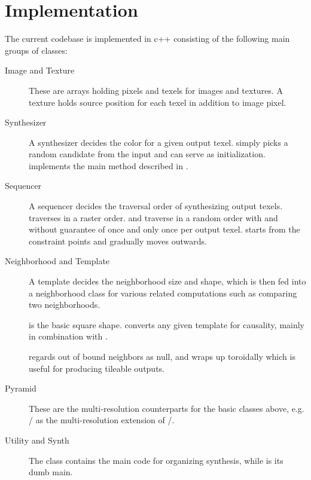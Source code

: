 \section{Implementation}
\label{sec:implementation}

The current codebase is implemented in c++ consisting of the following main groups of classes:

\begin{description}

\item[Image and Texture]

These are arrays holding pixels and texels for images and textures.
A texture holds source position for each texel in addition to image pixel.

\item[Synthesizer]

A synthesizer decides the color for a given output texel.
 simply picks a random candidate from the input and can serve as initialization.
 implements the main method described in .

\item[Sequencer]

A sequencer decides the traversal order of synthesizing output texels.
 traverses in a raster order.
 and  traverse in a random order with and without guarantee of once and only once per output texel.
 starts from the constraint points and gradually moves outwards.
 
\item[Neighborhood and Template]
A template decides the neighborhood size and shape, which is then fed into a neighborhood class for various related computations such as comparing two neighborhoods.

 is the basic square shape.
 converts any given template for causality, mainly in combination with .

 regards out of bound neighbors as null, and  wraps up toroidally which is useful for producing tileable outputs.

\item[Pyramid]

These are the multi-resolution counterparts for the basic classes above, e.g. / as the multi-resolution extension of /.

\item[Utility and Synth]

The  class contains the main code for organizing synthesis, while  is its dumb main.

\end{description}

